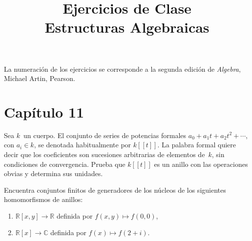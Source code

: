 \documentclass[12pt]{article}
\title{Ejercicios de Clase\\ Estructuras Algebraicas}
\author{}
\date{}
\begin{document}
    
    \maketitle
    

    
    
    
    
    \setlength{\aweboxleftmargin}{0.22\linewidth}
    \setlength{\aweboxcontentwidth}{0.78\linewidth}
    
    
    
    
    
    
    \bigskip
    
    La numeración de los ejercicios se corresponde a la segunda edición de \emph{Algebra}, Michael Artin, Pearson.
    
    
    
    \section*{Capítulo 11}
    
    \begin{exercise}[11.2.2]
        Sea $k$~un cuerpo. El conjunto de series de potencias formales $a_{0}+a_{1}t+a_{2}t^{2}+\cdots$, con $a_{i}\in k$, se denotada habitualmente por $k[\![t]\!]$. La palabra formal quiere decir que los coeficientes son sucesiones arbitrarias de elementos de~$k$, sin condiciones de convergencia. Prueba que $k[\![t]\!]$ es un anillo con las operaciones obvias y determina sus unidades.
    \end{exercise}
    
    \begin{exercise}[11.3.3]
        Encuentra conjuntos finitos de generadores de los núcleos de los siguientes homomorfismos de anillos:
        \begin{enumerate}[\bfseries(a)]
            \item $\mathbb{R}[x,y]\to \mathbb{R}$ definida por $f(x,y)\mapsto f(0,0)$,
            \item $\mathbb{R}[x]\to \mathbb{C}$ definida por $f(x)\mapsto f(2+i)$.
        \end{enumerate}
    \end{exercise}
    
\end{document}
